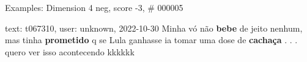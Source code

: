 \begin{frame}{Examples: Dimension 4 neg, score -3, \# 000005}
\footnotesize
\begin{alertblock}{text: t067310, user: unknown, 2022-10-30}
Minha vó não \textbf{bebe} de jeito nenhum, mas tinha \textbf{prometido} q se 
Lula ganhasse ia tomar uma dose de \textbf{cachaça} . . . quero ver isso 
acontecendo kkkkkk 
\end{alertblock}
\end{frame}
